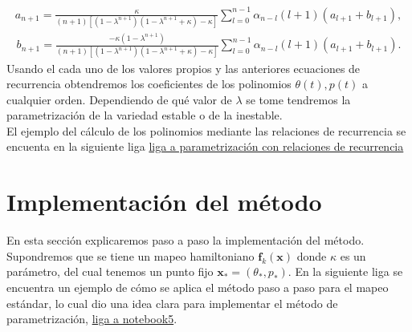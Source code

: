 \begin{eqnarray}
a_{n+1}=\frac{\kappa}{(n+1)[(1-\lambda^{n+1})(1-\lambda^{n+1}+\kappa)-\kappa]}\sum_{l=0}^{n-1}\alpha_{n-l}(l+1)(a_{l+1}+b_{l+1}),
\end{eqnarray}
\begin{eqnarray}
b_{n+1}=\frac{-\kappa(1-\lambda^{n+1})}{(n+1)[(1-\lambda^{n+1})(1-\lambda^{n+1}+\kappa)-\kappa]}\sum_{l=0}^{n-1}\alpha_{n-l}(l+1)(a_{l+1}+b_{l+1}).
\end{eqnarray}
Usando el cada uno de los valores propios y las anteriores ecuaciones de recurrencia obtendremos los coeficientes de los polinomios $\theta(t),p(t)$ a cualquier orden. Dependiendo de qué valor de $\lambda$ se tome tendremos la parametrización de la variedad estable o de la inestable.\\

El ejemplo del cálculo de los polinomios mediante las relaciones de recurrencia se encuenta en la siguiente liga \url{liga a parametrización con relaciones de recurrencia}






\section{Implementación del método}
En esta sección explicaremos paso a paso la implementación del método. Supondremos que se tiene un mapeo hamiltoniano $\mathbf{f}_{k}(\mathbf{x})$ donde $\kappa$  es un parámetro, del cual tenemos un punto fijo $\mathbf{x}_{*}=(\theta_{*},p_{*})$. En la siguiente liga se encuentra un ejemplo de cómo se aplica el método paso a paso para el mapeo estándar, lo cual dio una idea clara para implementar el método de parametrización, \url{liga a notebook5}. 
\linebreak


